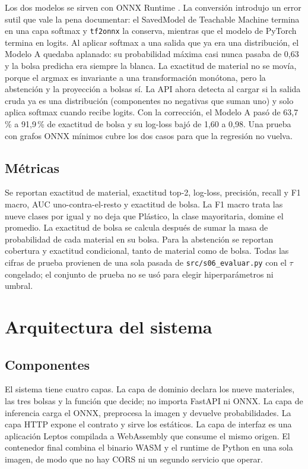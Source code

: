\documentclass[10pt]{ieeeconf}
\begin{document}
Los dos modelos se sirven con ONNX Runtime \cite{onnxruntime}. La conversi\'on
introdujo un error sutil que vale la pena documentar: el SavedModel de Teachable
Machine termina en una capa softmax y \texttt{tf2onnx} la conserva, mientras que
el modelo de PyTorch termina en logits. Al aplicar softmax a una salida que ya era
una distribuci\'on, el Modelo A quedaba aplanado: su probabilidad m\'axima casi
nunca pasaba de 0,63 y la bolsa predicha era siempre la blanca. La exactitud de
material no se mov\'ia, porque el argmax es invariante a una transformaci\'on
mon\'otona, pero la abstenci\'on y la proyecci\'on a bolsas s\'i. La API ahora
detecta al cargar si la salida cruda ya es una distribuci\'on (componentes no
negativas que suman uno) y solo aplica softmax cuando recibe logits. Con la
correcci\'on, el Modelo A pas\'o de 63,7\,\% a 91,9\,\% de exactitud de bolsa y su
log-loss baj\'o de 1,60 a 0,98. Una prueba con grafos ONNX m\'inimos cubre los dos
casos para que la regresi\'on no vuelva.

\subsection{M\'etricas}

Se reportan exactitud de material, exactitud top-2, log-loss, precisi\'on, recall
y F1 macro, AUC uno-contra-el-resto y exactitud de bolsa. La F1 macro trata las
nueve clases por igual y no deja que Pl\'astico, la clase mayoritaria, domine el
promedio. La exactitud de bolsa se calcula despu\'es de sumar la masa de
probabilidad de cada material en su bolsa. Para la abstenci\'on se reportan
cobertura y exactitud condicional, tanto de material como de bolsa. Todas las
cifras de prueba provienen de una sola pasada de \texttt{src/s06\_evaluar.py} con
el $\tau$ congelado; el conjunto de prueba no se us\'o para elegir hiperpar\'ametros
ni umbral.

\section{Arquitectura del sistema}
\label{sec:sistema}

\subsection{Componentes}

El sistema tiene cuatro capas. La capa de dominio declara los nueve materiales,
las tres bolsas y la funci\'on que decide; no importa FastAPI ni ONNX. La capa de
inferencia carga el ONNX, preprocesa la imagen y devuelve probabilidades. La capa
HTTP expone el contrato y sirve los est\'aticos. La capa de interfaz es una
aplicaci\'on Leptos compilada a WebAssembly que consume el mismo origen. El
contenedor final combina el binario WASM y el runtime de Python en una sola
imagen, de modo que no hay CORS ni un segundo servicio que operar.
\end{document}
